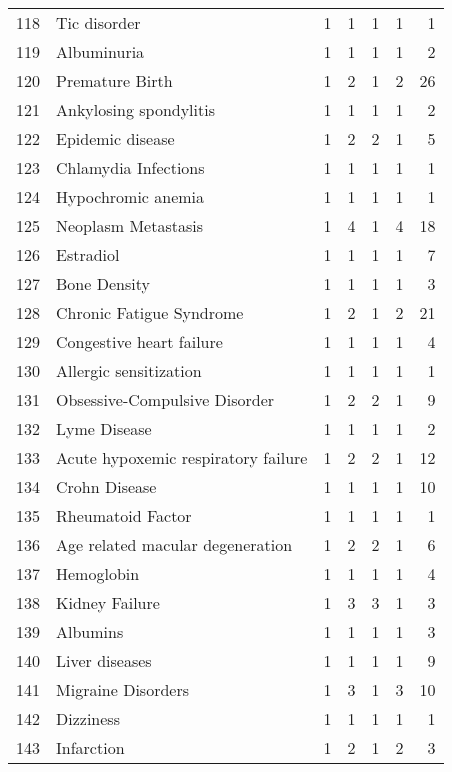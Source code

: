 \begin{tabular}{llrrrrr}
118 & Tic disorder & 1 & 1 & 1 & 1 & 1 \\
119 & Albuminuria & 1 & 1 & 1 & 1 & 2 \\
120 & Premature Birth & 1 & 2 & 1 & 2 & 26 \\
121 & Ankylosing spondylitis & 1 & 1 & 1 & 1 & 2 \\
122 & Epidemic disease & 1 & 2 & 2 & 1 & 5 \\
123 & Chlamydia Infections & 1 & 1 & 1 & 1 & 1 \\
124 & Hypochromic anemia & 1 & 1 & 1 & 1 & 1 \\
125 & Neoplasm Metastasis & 1 & 4 & 1 & 4 & 18 \\
126 & Estradiol & 1 & 1 & 1 & 1 & 7 \\
127 & Bone Density & 1 & 1 & 1 & 1 & 3 \\
128 & Chronic Fatigue Syndrome & 1 & 2 & 1 & 2 & 21 \\
129 & Congestive heart failure & 1 & 1 & 1 & 1 & 4 \\
130 & Allergic sensitization & 1 & 1 & 1 & 1 & 1 \\
131 & Obsessive-Compulsive Disorder & 1 & 2 & 2 & 1 & 9 \\
132 & Lyme Disease & 1 & 1 & 1 & 1 & 2 \\
133 & Acute hypoxemic respiratory failure & 1 & 2 & 2 & 1 & 12 \\
134 & Crohn Disease & 1 & 1 & 1 & 1 & 10 \\
135 & Rheumatoid Factor & 1 & 1 & 1 & 1 & 1 \\
136 & Age related macular degeneration & 1 & 2 & 2 & 1 & 6 \\
137 & Hemoglobin & 1 & 1 & 1 & 1 & 4 \\
138 & Kidney Failure & 1 & 3 & 3 & 1 & 3 \\
139 & Albumins & 1 & 1 & 1 & 1 & 3 \\
140 & Liver diseases & 1 & 1 & 1 & 1 & 9 \\
141 & Migraine Disorders & 1 & 3 & 1 & 3 & 10 \\
142 & Dizziness & 1 & 1 & 1 & 1 & 1 \\
143 & Infarction & 1 & 2 & 1 & 2 & 3 \\
\end{tabular}
